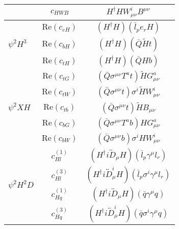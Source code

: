 \begin{table}
\begin{minipage}[t]{0.49\textwidth}
{\begin{tabular}{l|c|c}
                                                  & $c_{HWB}$             & $H^{\dagger}HW^{i}_{\mu\nu}B^{\mu\nu}$                                            \\
                \midrule
                \multirow{3}{*}{$\psi^2H^3$}      & $\mathrm{Re}(c_{eH})$ & $(H^{\dagger}H)(\bar{l}_p e_r H)$                                                 \\
                                                  & $\mathrm{Re}(c_{bH})$ & $(H^{\dagger}H)(\bar{Q} \tilde{H} t)$                                             \\
                                                  & $\mathrm{Re}(c_{tH})$ & $(H^{\dagger}H)(\bar{Q}Hb)$                                                       \\
                \midrule
                \multirow{5}{*}{$\psi^2{X}H$}     & $\mathrm{Re}(c_{tG})$ & $(\bar{Q}\sigma^{\mu\nu}{T^a}t)\tilde{H}G^a_{\mu\nu}$                             \\
                                                  & $\mathrm{Re}(c_{tW})$ & $(\bar{Q}\sigma^{\mu\nu}t)\sigma^i\tilde{H}W^i_{\mu\nu}$                          \\
                                                  & $\mathrm{Re}(c_{tb})$ & $(\bar{Q}\sigma^{\mu\nu}t)\tilde{H}B_{\mu\nu}$                                    \\
                                                  & $\mathrm{Re}(c_{bG})$ & $(\bar{Q}\sigma^{\mu\nu}{T^a}b)HG^a_{\mu\nu}$                                     \\
                                                  & $\mathrm{Re}(c_{bW})$ & $(\bar{Q}\sigma^{\mu\nu}b)\sigma^i{H}W^i_{\mu\nu}$                                \\
                \midrule
                \multirow{6}{*}{$\psi^2{H}^2{D}$} & $c^{(1)}_{Hl}$        & $(H^{\dagger}i\overleftrightarrow{D}_{\mu}H)(\bar{l}_p \gamma^\mu l_r)$           \\
                                                  & $c^{(3)}_{Hl}$        & $(H^{\dagger}i\overleftrightarrow{D}^i_{\mu}H)(\bar{l}_p \sigma^i\gamma^\mu l_r)$ \\
                                                  & $c^{(1)}_{Hq}$        & $(H^{\dagger}i\overleftrightarrow{D}_{\mu}H)(\bar{q} \gamma^\mu q)$               \\
                                                  & $c^{(3)}_{Hq}$        & $(H^{\dagger}i\overleftrightarrow{D}^i_{\mu}H)(\bar{q} \sigma^i\gamma^\mu q)$     \\

\end{tabular}}
\end{minipage}
\end{table}
